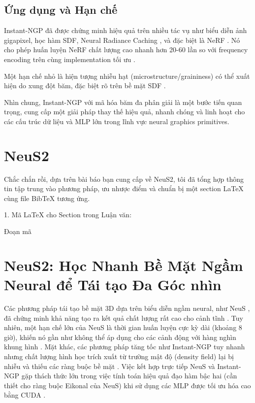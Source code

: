 \subsection{Ứng dụng và Hạn chế}

Instant-NGP đã được chứng minh hiệu quả trên nhiều tác vụ như biểu diễn ảnh gigapixel, học hàm SDF, Neural Radiance Caching \cite{Muller2021NRC}, và đặc biệt là NeRF \cite{Muller2022InstantNGP_source_1}. Nó cho phép huấn luyện NeRF chất lượng cao nhanh hơn 20-60 lần so với frequency encoding trên cùng implementation tối ưu \cite{Muller2022InstantNGP_source_281, Muller2022InstantNGP_source_299}.

Một hạn chế nhỏ là hiện tượng nhiễu hạt (microstructure/graininess) có thể xuất hiện do xung đột băm, đặc biệt rõ trên bề mặt SDF \cite{Muller2022InstantNGP_source_228, Muller2022InstantNGP_source_245, Muller2022InstantNGP_source_328}.

Nhìn chung, Instant-NGP với mã hóa băm đa phân giải là một bước tiến quan trọng, cung cấp một giải pháp thay thế hiệu quả, nhanh chóng và linh hoạt cho các cấu trúc dữ liệu và MLP lớn trong lĩnh vực neural graphics primitives.
\section{NeuS2}
Chắc chắn rồi, dựa trên bài báo bạn cung cấp về NeuS2, tôi đã tổng hợp thông tin tập trung vào phương pháp, ưu nhược điểm và chuẩn bị một section LaTeX cùng file BibTeX tương ứng.

1. Mã LaTeX cho Section trong Luận văn:

Đoạn mã

\section{NeuS2: Học Nhanh Bề Mặt Ngầm Neural để Tái tạo Đa Góc nhìn}

Các phương pháp tái tạo bề mặt 3D dựa trên biểu diễn ngầm neural, như NeuS \cite{Wang2021NeuS}, đã chứng minh khả năng tạo ra kết quả chất lượng rất cao cho cảnh tĩnh \cite{Wang2023NeuS2_source_1}. Tuy nhiên, một hạn chế lớn của NeuS là thời gian huấn luyện cực kỳ dài (khoảng 8 giờ), khiến nó gần như không thể áp dụng cho các cảnh động với hàng nghìn khung hình \cite{Wang2023NeuS2_source_2, Wang2023NeuS2_source_17}. Mặt khác, các phương pháp tăng tốc như Instant-NGP \cite{Muller2022InstantNGP} tuy nhanh nhưng chất lượng hình học trích xuất từ trường mật độ (density field) lại bị nhiễu và thiếu các ràng buộc bề mặt \cite{Wang2023NeuS2_source_19, Wang2023NeuS2_source_94}. Việc kết hợp trực tiếp NeuS và Instant-NGP gặp thách thức lớn trong việc tính toán hiệu quả đạo hàm bậc hai (cần thiết cho ràng buộc Eikonal của NeuS) khi sử dụng các MLP được tối ưu hóa cao bằng CUDA \cite{Wang2023NeuS2_source_23, Wang2023NeuS2_source_24, Wang2023NeuS2_source_95, Wang2023NeuS2_source_96, Wang2023NeuS2_source_97, Wang2023NeuS2_source_98}.

